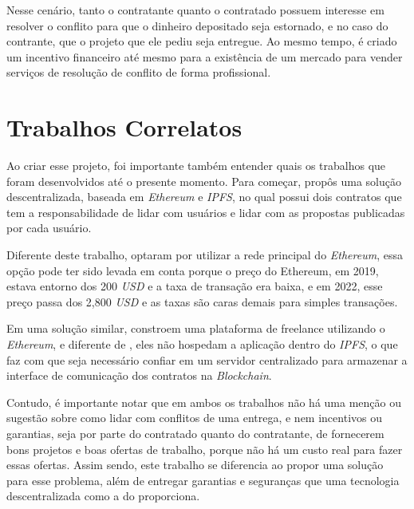 Nesse cenário, tanto o contratante quanto o contratado possuem interesse em resolver o conflito para que o dinheiro depositado seja estornado, e no caso do contrante, que o projeto que ele pediu seja entregue. Ao mesmo tempo, é criado um incentivo financeiro até mesmo para a existência de um mercado para vender serviços de resolução de conflito de forma profissional.

\section{Trabalhos Correlatos}

Ao criar esse projeto, foi importante também entender quais os trabalhos que foram desenvolvidos até o presente momento. Para começar, \cite{gandhi2019decentralized} propôs uma solução descentralizada, baseada em \textit{Ethereum} e \textit{IPFS}, no qual possui dois contratos que tem a responsabilidade de lidar com usuários e lidar com as propostas publicadas por cada usuário. 

Diferente deste trabalho, \citeauthor{gandhi2019decentralized} optaram por utilizar a  rede principal do \textit{Ethereum}, essa opção pode ter sido levada em conta porque o preço do Ethereum, em 2019, estava entorno dos 200 \textit{USD} \cite{ethereum_price_2019} e a taxa de transação era baixa, e em 2022, esse preço passa dos 2,800 \textit{USD} \cite{ethereum_price_2022} e as taxas são caras demais para simples transações.

Em uma solução similar, \cite{freelancing_blockchain_related} constroem uma plataforma de freelance utilizando o \textit{Ethereum}, e diferente de \citeauthor{gandhi2019decentralized}, eles não hospedam a aplicação dentro do \textit{IPFS}, o que faz com que seja necessário confiar em um servidor centralizado para armazenar a interface de comunicação dos contratos na \textit{Blockchain}.

Contudo, é importante notar que em ambos os trabalhos não há uma menção ou sugestão sobre como lidar com conflitos de uma entrega, e nem incentivos ou garantias, seja por parte do contratado quanto do contratante, de fornecerem bons projetos e boas ofertas de trabalho, porque não há um custo real para fazer essas ofertas. Assim sendo, este trabalho se diferencia ao propor uma solução para esse problema, além de entregar garantias e seguranças que uma tecnologia descentralizada como a do  proporciona.


